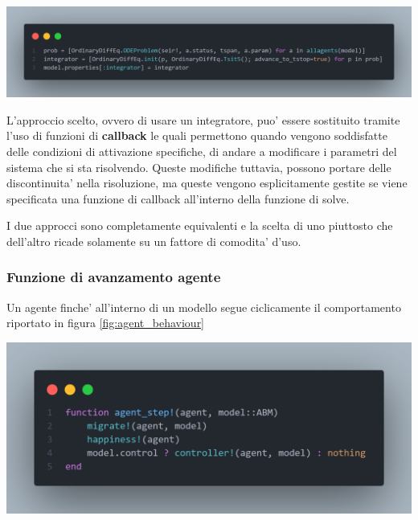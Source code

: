 \begin{minipage}{\linewidth}
	\centering
	\includegraphics[width=\textwidth]{img/model_ode.png}
	\label{fig:model_ode}
\end{minipage}

L'approccio scelto, ovvero di usare un integratore, puo' essere sostituito tramite
l'uso di funzioni di \textbf{callback} le quali permettono quando vengono soddisfatte delle
condizioni di attivazione specifiche, di andare a modificare i parametri del sistema che
si sta risolvendo. Queste modifiche tuttavia, possono portare delle discontinuita' nella 
risoluzione, ma queste vengono esplicitamente gestite se viene specificata una funzione 
di callback all'interno della funzione di solve. 

I due approcci sono completamente equivalenti e la scelta di uno piuttosto che dell'altro
ricade solamente su un fattore di comodita' d'uso.

\subsubsection{Funzione di avanzamento agente}
Un agente finche' all'interno di un modello segue ciclicamente il comportamento
riportato in figura \ref{fig:agent_behaviour}

\begin{minipage}{\linewidth}
	\centering
	\includegraphics[width=\textwidth]{img/agent_behaviour.png}
	\label{fig:agent_behaviour}
\end{minipage}


